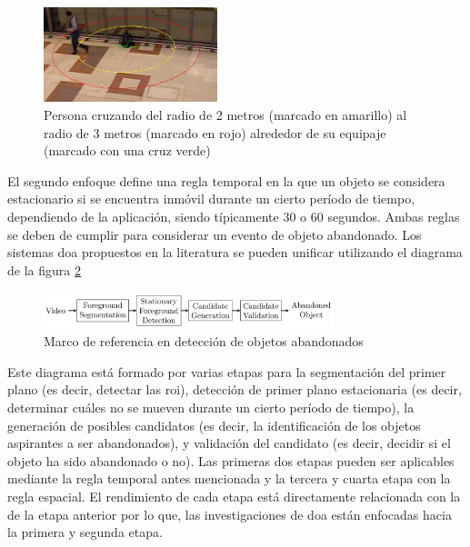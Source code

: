 \begin{figure}[ht]
\centering
\includegraphics[width=0.45\textwidth]{img/chapters/introduccion/pets2006-3m.jpeg}
\caption{\label{fig:pets2006-3m}Persona cruzando del radio de 2 metros (marcado en amarillo) al radio de 3 metros (marcado en rojo) alrededor de su equipaje (marcado con una cruz verde) \cite{7789647}}
\end{figure}

El segundo enfoque define una regla temporal en la que un objeto se considera estacionario si se encuentra inmóvil durante un cierto período de tiempo, dependiendo de la aplicación, siendo típicamente 30 o 60 segundos. Ambas reglas se deben de cumplir para considerar un evento de objeto abandonado. Los sistemas \gls{doa} propuestos en la literatura se pueden unificar utilizando el diagrama de la figura \ref{fig:canonical-framework-aod}

\begin{figure}[ht]
\centering
\includegraphics[width=0.75\textwidth]{img/chapters/introduccion/canonical-framework-aod.png}
\caption{\label{fig:canonical-framework-aod}Marco de referencia en detección de objetos abandonados}
\end{figure}

Este diagrama está formado por varias etapas para la segmentación del primer plano (es decir, detectar las \gls{roi}), detección de primer plano estacionaria (es decir, determinar cuáles no se mueven durante un cierto período de tiempo), la generación de posibles candidatos (es decir, la identificación de los objetos aspirantes a ser abandonados), y validación del candidato (es decir, decidir si el objeto ha sido abandonado o no). Las primeras dos etapas pueden ser aplicables mediante la regla temporal antes mencionada y la tercera y cuarta etapa con la regla espacial. El rendimiento de cada etapa está directamente relacionada con la de la etapa anterior por lo que, las investigaciones de \gls{doa} están enfocadas hacia la primera y segunda etapa.

